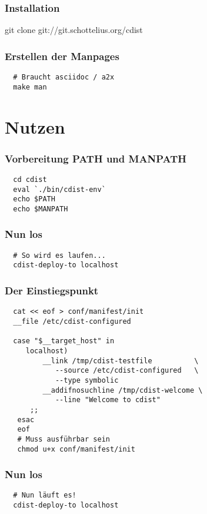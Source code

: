 \documentclass{beamer}
\begin{document}
\frame
{
  \frametitle{Installation}
  \begin{center}
  git clone git://git.schottelius.org/cdist
  \end{center}
}

\begin{frame}[fragile]
  \frametitle{Erstellen der Manpages}

  \begin{verbatim}
  # Braucht asciidoc / a2x
  make man
  \end{verbatim}
\end{frame}

\section{Nutzen}
\begin{frame}[fragile]
  \frametitle{Vorbereitung PATH und MANPATH}

  \begin{verbatim}
  cd cdist
  eval `./bin/cdist-env`
  echo $PATH
  echo $MANPATH
  \end{verbatim}
\end{frame}

\begin{frame}[fragile]
  \frametitle{Nun los}
  \begin{verbatim}
  # So wird es laufen...
  cdist-deploy-to localhost
  \end{verbatim}
\end{frame}

\begin{frame}[fragile]
  \frametitle{Der Einstiegspunkt}
  \begin{small}
  \begin{verbatim}
  cat << eof > conf/manifest/init
  __file /etc/cdist-configured

  case "$__target_host" in
     localhost)
         __link /tmp/cdist-testfile          \
            --source /etc/cdist-configured   \ 
            --type symbolic
         __addifnosuchline /tmp/cdist-welcome \
            --line "Welcome to cdist"
      ;;
   esac
   eof
   # Muss ausführbar sein
   chmod u+x conf/manifest/init

  \end{verbatim}
  \end{small}
\end{frame}

\begin{frame}[fragile]
  \frametitle{Nun los}
  \begin{verbatim}
  # Nun läuft es!
  cdist-deploy-to localhost
  \end{verbatim}
\end{frame}
\end{document}
